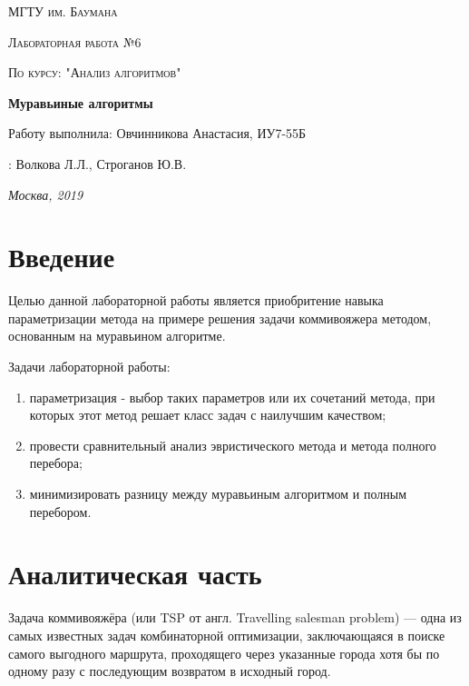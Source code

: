 \documentclass[a4paper,14pt]{report}
\begin{document}
\begin{titlepage}
	\centering
	{\scshape\LARGE МГТУ им. Баумана \par}
	\vspace{3cm}
	{\scshape\Large Лабораторная работа №6\par}
	\vspace{0.5cm}
	{\scshape\Large По курсу: "Анализ алгоритмов"\par}
	\vspace{1.5cm}
	{\huge\bfseries Муравьиные алгоритмы\par}
	\vspace{2cm}
	\Large Работу выполнила: Овчинникова Анастасия, ИУ7-55Б\par
	\vspace{0.5cm}
	:  Волкова Л.Л., Строганов Ю.В.\par

	\vfill
	\large \textit {Москва, 2019} \par
\end{titlepage}

\tableofcontents

\newpage
\chapter*{Введение}
Целью данной лабораторной работы является приобритение навыка параметризации метода на примере решения задачи коммивояжера методом, основанным на муравьином алгоритме.

Задачи лабораторной работы:

\begin{enumerate}
	\item параметризация - выбор таких параметров или их сочетаний метода, при которых этот метод решает класс задач с наилучшим качеством;
	\item провести сравнительный анализ эвристического метода и метода полного перебора;
	\item минимизировать разницу между муравьиным алгоритмом и полным перебором.
\end{enumerate}


\chapter*{Аналитическая часть}

Задача коммивояжёра (или TSP от англ. Travelling salesman problem) — одна из самых известных задач комбинаторной оптимизации, заключающаяся в поиске самого выгодного маршрута, проходящего через указанные города хотя бы по одному разу с последующим возвратом в исходный город.
\end{document}
